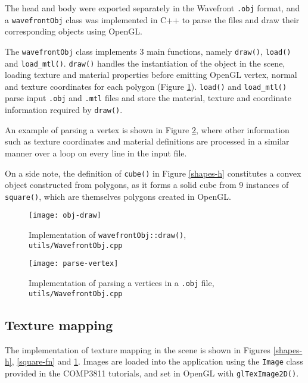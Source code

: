 \documentclass{article}
\begin{document}
		The head and body were exported separately in the Wavefront \texttt{.obj} format, and a \texttt{wavefrontObj} class
		was implemented in C++ to parse the files and draw their corresponding objects using OpenGL.
		
		\bigskip
		
		The \texttt{wavefrontObj} class implements 3 main functions, namely \texttt{draw()}, \texttt{load()} and
		\texttt{load\_mtl()}. \texttt{draw()} handles the instantiation of the object in the scene, loading texture and
		material properties before emitting OpenGL vertex, normal and texture coordinates for each polygon
		(Figure \ref{obj-draw}). \texttt{load()} and \texttt{load\_mtl()} parse input \texttt{.obj} and \texttt{.mtl} files
		and store the material, texture and coordinate information required by \texttt{draw()}.
		
		\bigskip
		
		An example of parsing a vertex
		is shown in Figure \ref{parse-vert}, where other information such as texture coordinates and material definitions
		are processed in a similar manner over a loop on every line in the input file.
		
		\bigskip
		
		On a side note, the definition of \texttt{cube()} in Figure \ref{shapes-h} constitutes a convex object constructed from
		polygons, as it forms a solid cube from 9 instances of \texttt{square()}, which are themselves polygons created in OpenGL.

			\begin{figure}[h]
				\centering	
				\texttt{[image: obj-draw]}
				\caption{Implementation of \texttt{wavefrontObj::draw()}, \texttt{utils/WavefrontObj.cpp}}
				\label{obj-draw}
			\end{figure}
			\begin{figure}[h]
				\centering	
				\texttt{[image: parse-vertex]}
				\caption{Implementation of parsing a vertices in a \texttt{.obj} file, \texttt{utils/WavefrontObj.cpp}}
				\label{parse-vert}
			\end{figure}

		\subsection{Texture mapping}
		The implementation of texture mapping in the scene is shown in
		Figures \ref{shapes-h}, \ref{square-fn} and \ref{obj-draw}. Images are loaded into the application using
		the \texttt{Image} class
		provided in the COMP3811 tutorials, and set in OpenGL with \texttt{glTexImage2D()}.
		
\end{document}
